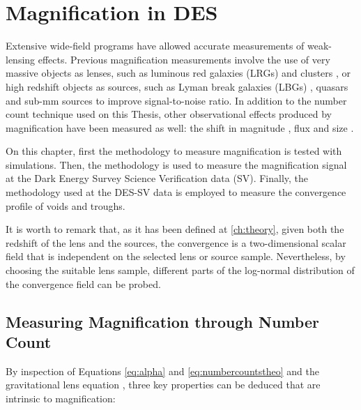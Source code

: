 \chapter{Magnification in DES}
\label{ch:magnification}

Extensive wide-field programs have allowed accurate measurements of weak-lensing effects. Previous magnification measurements involve the use of very massive objects as lenses, such as luminous red galaxies (LRGs) and clusters \cite{1995AIPC..336..320B,2014MNRAS.440.3701B,2014MNRAS.439.3755F,2016MNRAS.457.3050C}, or high redshift objects as sources, such as Lyman break galaxies (LBGs) \cite{2009A&A...507..683H,2012MNRAS.426.2489M}, quasars \cite{1979ApJ...227...30S,1989Natur.339..106H,1990A&A...240...11F,1993A&A...268....1B,2002A&A...386..784M,0004-637X-633-2-589} and sub-mm sources  \cite{2011MNRAS.414..596W} to improve signal-to-noise ratio. In addition to the number count technique used on this Thesis, other observational effects produced by magnification have been measured as well: the shift in magnitude \cite{2010MNRAS.405.1025M}, flux \cite{2011MNRAS.411.2113J} and size \cite{2041-8205-780-2-L16}.
\newline

On this chapter, first the methodology to measure magnification is tested with simulations. Then, the methodology is used to measure the magnification signal at the Dark Energy Survey Science Verification data (SV). Finally, the methodology used at the DES-SV data is employed to measure the convergence profile of voids and troughs.
\newline

It is worth to remark that, as it has been defined at \autoref{ch:theory}, given both the redshift of the lens and the sources, the convergence is a two-dimensional scalar field that is independent on the selected lens or source sample. Nevertheless, by choosing the suitable lens sample, different parts of the log-normal distribution of the convergence field \cite{2017MNRAS.466.1444C} can be probed.

\section{Measuring Magnification through Number Count}
\label{sec:method}
By inspection of Equations \ref{eq:alpha} and \ref{eq:numbercountstheo} and the gravitational lens equation \cite{1992ARA&A..30..311B}, three key properties can be deduced that are intrinsic to magnification:

